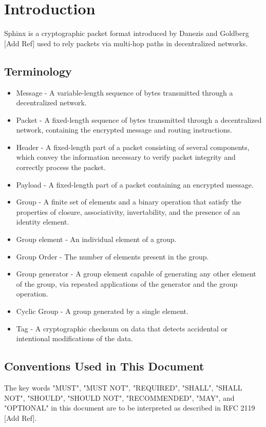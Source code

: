 \section{Introduction}\label{sec:introduction}

Sphinx is a cryptographic packet format introduced by Danezis and Goldberg [Add Ref] used to rely packets via multi-hop paths in decentralized networks.

\subsection{Terminology}\label{sec:terminology}
\begin{itemize}
    \item Message -  A variable-length sequence of bytes transmitted through a decentralized network.
    \item Packet - A fixed-length sequence of bytes transmitted through a decentralized network, containing the encrypted message and routing instructions.
    \item Header - A fixed-length part of a packet consisting of several components, which convey the information necessary to verify packet integrity and correctly process the packet.
    \item Payload - A fixed-length part of a packet containing an encrypted message.
    \item Group - A finite set of elements and a binary operation that satisfy the properties of closure, associativity, invertability, and the presence of an identity element.
    \item Group element - An individual element of a group.
    \item Group Order - The number of elements present in the group. 
    \item Group generator - A group element capable of generating any other element of the group, via repeated applications of the generator and the group operation. 
    \item Cyclic Group - A group generated by a single element.
    \item Tag - A cryptographic checksum on data that detects accidental or intentional modifications of the data.
\end{itemize}

\subsection{Conventions Used in This Document}
The key words "MUST", "MUST NOT", "REQUIRED", "SHALL", "SHALL NOT", "SHOULD", "SHOULD NOT", "RECOMMENDED",  "MAY", and "OPTIONAL" in this document are to be interpreted as described in RFC 2119 [Add Ref].

